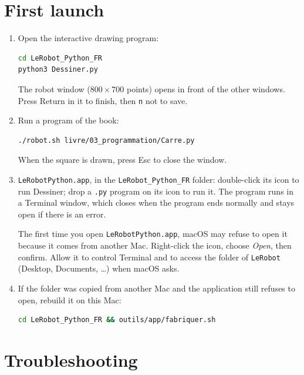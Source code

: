 \documentclass[11pt,a4paper]{article}
\newcommand{\kbd}[1]{\texttt{#1}}
\begin{document}
\section{First launch}

\begin{enumerate}
\item Open the interactive drawing program:
\begin{lstlisting}[language=bash]
cd LeRobot_Python_FR
python3 Dessiner.py
\end{lstlisting}
  The robot window ($800 \times 700$ points) opens in front of the other
  windows. Press Return in it to finish, then \kbd{n} not to save.
\item Run a program of the book:
\begin{lstlisting}[language=bash]
./robot.sh livre/03_programmation/Carre.py
\end{lstlisting}
  When the square is drawn, press Esc to close the window.
\item \kbd{LeRobotPython.app}, in the \kbd{LeRobot\_Python\_FR} folder:
  double-click its icon to run Dessiner; drop a \kbd{.py} program on its
  icon to run it. The program runs in a Terminal window, which closes when
  the program ends normally and stays open if there is an error.

  The first time you open \kbd{LeRobotPython.app}, macOS may refuse to open
  it because it comes from another Mac. Right-click the icon, choose
  \emph{Open}, then confirm. Allow it to control Terminal and to access the
  folder of \kbd{LeRobot} (Desktop, Documents, \dots) when macOS asks.
\item If the folder was copied from another Mac and the application still
  refuses to open, rebuild it on this Mac:
\begin{lstlisting}[language=bash]
cd LeRobot_Python_FR && outils/app/fabriquer.sh
\end{lstlisting}
\end{enumerate}

\section{Troubleshooting}
\end{document}

